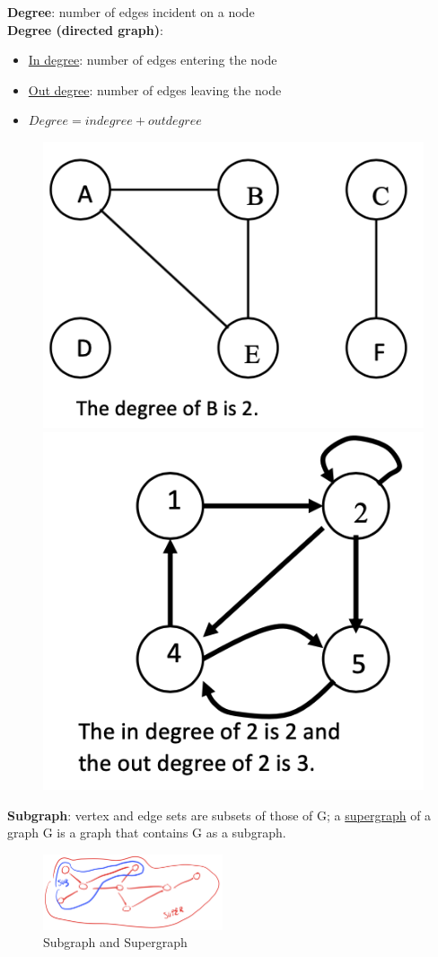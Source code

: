 \documentclass[10pt,a4paper]{article}
\begin{document}
\textbf{Degree}: number of edges incident on a node \\
\textbf{Degree (directed graph)}: 
\begin{itemize}
	\item \uline{In degree}: number of edges entering the node
	\item \uline{Out degree}: number of edges leaving the node
	\item $Degree = indegree + outdegree$
\end{itemize}
\begin{figure}[h!]
\begin{minipage}{.5\textwidth}
  \centering
  \includegraphics[width=.5\linewidth]{images/graph-degree}
\end{minipage}%
\begin{minipage}{.5\textwidth}
  \centering
  \includegraphics[width=.5\linewidth]{images/directed-graph-degree}
\end{minipage}
\end{figure}
\textbf{Subgraph}: vertex and edge sets are subsets of those of G; a \uline{supergraph} of a graph G is a graph that contains G as a subgraph.
\begin{figure}[h!]
 \hfill \includegraphics[width=150pt]{images/subgraph.png}\hspace*{\fill}
  \caption{Subgraph and Supergraph}
\end{figure} 
\pagebreak
\end{document}
